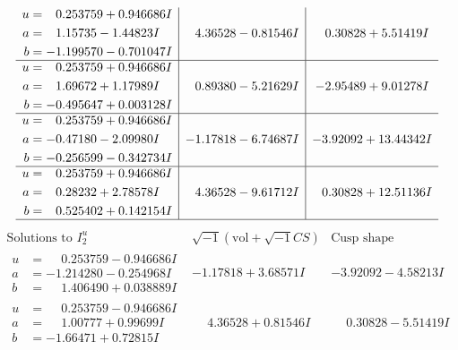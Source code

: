 \documentclass[1p]{elsarticle_modified}
\theoremstyle{definition}
\newcommand{\I}{\sqrt{-1}}
\begin{document}
$$\begin{array}{c|c|c}
\begin{aligned}
u &= \phantom{-}0.253759 + 0.946686 I \\
a &= \phantom{-}1.15735 - 1.44823 I \\
b &= -1.199570 - 0.701047 I\end{aligned}
 & \phantom{-}4.36528 - 0.81546 I & \phantom{-}0.30828 + 5.51419 I \\ \hline\begin{aligned}
u &= \phantom{-}0.253759 + 0.946686 I \\
a &= \phantom{-}1.69672 + 1.17989 I \\
b &= -0.495647 + 0.003128 I\end{aligned}
 & \phantom{-}0.89380 - 5.21629 I & -2.95489 + 9.01278 I \\ \hline\begin{aligned}
u &= \phantom{-}0.253759 + 0.946686 I \\
a &= -0.47180 - 2.09980 I \\
b &= -0.256599 - 0.342734 I\end{aligned}
 & -1.17818 - 6.74687 I & -3.92092 + 13.44342 I \\ \hline\begin{aligned}
u &= \phantom{-}0.253759 + 0.946686 I \\
a &= \phantom{-}0.28232 + 2.78578 I \\
b &= \phantom{-}0.525402 + 0.142154 I\end{aligned}
 & \phantom{-}4.36528 - 9.61712 I & \phantom{-}0.30828 + 12.51136 I\\
 \hline 
 \end{array}$$\newpage$$\begin{array}{c|c|c}  
\text{Solutions to }I^u_{2}& \I (\text{vol} + \sqrt{-1}CS) & \text{Cusp shape}\\
 \hline 
\begin{aligned}
u &= \phantom{-}0.253759 - 0.946686 I \\
a &= -1.214280 - 0.254968 I \\
b &= \phantom{-}1.406490 + 0.038889 I\end{aligned}
 & -1.17818 + 3.68571 I & -3.92092 - 4.58213 I \\ \hline\begin{aligned}
u &= \phantom{-}0.253759 - 0.946686 I \\
a &= \phantom{-}1.00777 + 0.99699 I \\
b &= -1.66471 + 0.72815 I\end{aligned}
 & \phantom{-}4.36528 + 0.81546 I & \phantom{-}0.30828 - 5.51419 I \\ \hline\begin{aligned}

\end{aligned}
\end{array}$$
\end{document}
